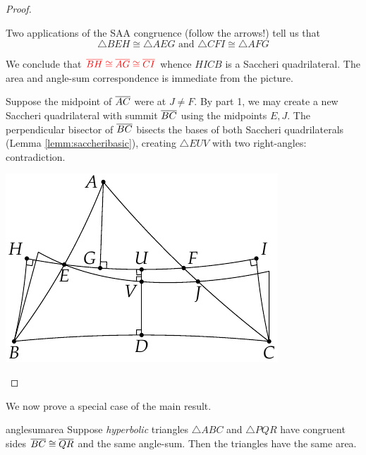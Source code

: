 \begin{proof}
	\begin{enumerate}
	  \item Two applications of the SAA congruence (follow the arrows!) tell us that\vspace{-3pt}
	  \[
	  	\triangle BEH\cong\triangle AEG\text{ \ and \ }\triangle CFI\cong\triangle AFG
	  \]
	  \begin{minipage}[t]{0.6\linewidth}\vspace{-11pt}
		  We conclude that $\textcolor{red}{\overline{BH}\cong\overline{AG}\cong\overline{CI}}$ whence $HICB$ is a Saccheri quadrilateral. The area and angle-sum correspondence is immediate from the picture.
		  \item Suppose the midpoint of $\overline{AC}$ were at $J\neq F$. By part 1, we may create a new Saccheri quadrilateral with summit $\overline{BC}$ using the midpoints $E,J$.\smallbreak
		  The perpendicular bisector of $\overline{BC}$ bisects the bases of both Saccheri quadrilaterals (Lemma \ref{lemm:saccheribasic}), creating $\triangle EUV$ with two right-angles: contradiction.
		\end{minipage}
		\hfill
		\begin{minipage}[t]{0.39\linewidth}\vspace{-22pt}
			\flushright\includegraphics[scale=0.95]{area-saccheri5}\qedhere
		\end{minipage}		
	\end{enumerate}
\end{proof}

We now prove a special case of the main result.

\begin{lemm}{}{anglesumarea}
	Suppose \emph{hyperbolic} triangles $\triangle ABC$ and $\triangle PQR$ have congruent sides $\overline{BC}\cong\overline{QR}$ and the same angle-sum. Then the triangles have the same area.
\end{lemm}


